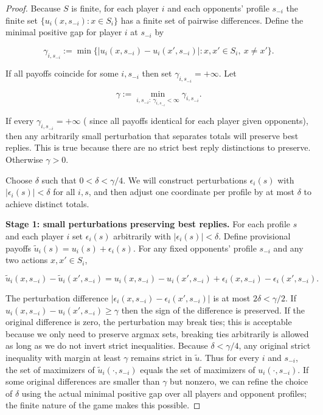 \documentclass[10pt,a4paper]{amsart}
\begin{document}
\begin{proof}
Because \(S\) is finite, for each player \(i\) and each opponents' profile
\(s_{-i}\) the finite set \(\{u_i(x,s_{-i}): x\in S_i\}\) has a finite set of
pairwise differences. Define the minimal positive gap for player \(i\) at
\(s_{-i}\) by


\[
\gamma_{i,s_{-i}} := \min\{ |u_i(x,s_{-i})-u_i(x',s_{-i})| : x,x'\in S_i,\ x\ne x'\}.
\]


If all payoffs coincide for some \(i,s_{-i}\) then set \(\gamma_{i,s_{-i}}=+\infty\). Let


\[
\gamma := \min_{i,s_{-i}:\ \gamma_{i,s_{-i}}<\infty} \gamma_{i,s_{-i}}.
\]


If every \(\gamma_{i,s_{-i}}=+\infty\) ( since all payoffs identical for each
player given opponents), then any arbitrarily small perturbation that
separates totals will preserve best replies. This is true because there are no strict best
reply distinctions to preserve. Otherwise \(\gamma>0\).

Choose \(\delta\) such that \(0<\delta<\gamma/4\). We will construct
perturbations \(\epsilon_i(s)\) with \(|\epsilon_i(s)|<\delta\) for all
\(i,s\), and then adjust one coordinate per profile by at most \(\delta\) to
achieve distinct totals.

\textbf{Stage 1: small perturbations preserving best replies.} For each
profile \(s\) and each player \(i\) set \(\epsilon_i(s)\) arbitrarily with
\(|\epsilon_i(s)|<\delta\). Define provisional payoffs
\(\tilde u_i(s)=u_i(s)+\epsilon_i(s)\). For any fixed opponents' profile
\(s_{-i}\) and any two actions \(x,x'\in S_i\),


\[
\tilde u_i(x,s_{-i})-\tilde u_i(x',s_{-i})
= u_i(x,s_{-i})-u_i(x',s_{-i}) + \epsilon_i(x,s_{-i})-\epsilon_i(x',s_{-i}).
\]


The perturbation difference \(|\epsilon_i(x,s_{-i})-\epsilon_i(x',s_{-i})|\)
is at most \(2\delta<\gamma/2\). If \(u_i(x,s_{-i})-u_i(x',s_{-i})\ge \gamma\)
then the sign of the difference is preserved. If the original difference is
zero, the perturbation may break ties; this is acceptable because we only
need to preserve argmax sets, breaking ties arbitrarily is allowed as long
as we do not invert strict inequalities. Because \(\delta<\gamma/4\), any
original strict inequality with margin at least \(\gamma\) remains strict in
\(\tilde u\). Thus for every \(i\) and \(s_{-i}\), the set of maximizers of
\(\tilde u_i(\cdot,s_{-i})\) equals the set of maximizers of \(u_i(\cdot,s_{-i})\).
If some original differences are smaller than \(\gamma\) but nonzero, we
can refine the choice of \(\delta\) using the actual minimal positive gap
over all players and opponent profiles; the finite nature of the game makes
this possible.


\end{proof}
\end{document}
